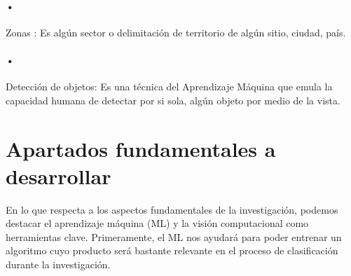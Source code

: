 \paragraph{•} Zonas : Es algún sector o delimitación de territorio de algún sitio, ciudad, país.

\paragraph{•} Detección de objetos: Es una técnica del Aprendizaje Máquina que emula la capacidad humana de detectar por si sola, algún objeto por medio de la vista.

%
%
\section{Apartados fundamentales a desarrollar}
En lo que respecta a los aspectos fundamentales de la investigación, podemos destacar el aprendizaje máquina (ML) y la visión computacional como herramientas clave. Primeramente, el ML nos ayudará para poder entrenar un algoritmo cuyo producto será bastante relevante en el proceso de clasificación durante la investigación.

